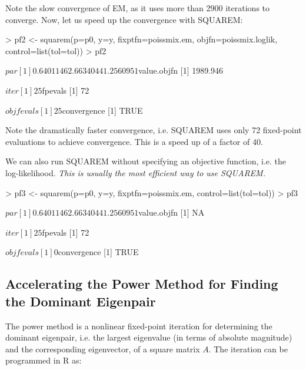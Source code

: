 \documentclass[english]{article}
\begin{document}
Note the slow convergence of EM, as it uses more than 2900 iterations to converge.  Now, let us speed up the convergence with SQUAREM:

\begin{Schunk}
\begin{Sinput}
> pf2 <- squarem(p=p0, y=y, fixptfn=poissmix.em, objfn=poissmix.loglik, 
  control=list(tol=tol))
> pf2
\end{Sinput}
\begin{Soutput}
$par
[1] 0.6401146 2.6634044 1.2560951

$value.objfn
[1] 1989.946

$iter
[1] 25

$fpevals
[1] 72

$objfevals
[1] 25

$convergence
[1] TRUE
\end{Soutput}
\end{Schunk}

Note the dramatically faster convergence, i.e. SQUAREM uses only 72 fixed-point evaluations to achieve convergence.  This is a speed up of a factor of 40.  

We can also run SQUAREM without specifying an objective function, i.e. the log-likelihood.  \emph{This is usually the most efficient way to use SQUAREM.}

\begin{Schunk}
\begin{Sinput}
> pf3 <- squarem(p=p0, y=y, fixptfn=poissmix.em, control=list(tol=tol))
> pf3
\end{Sinput}
\begin{Soutput}
$par
[1] 0.6401146 2.6634044 1.2560951

$value.objfn
[1] NA

$iter
[1] 25

$fpevals
[1] 72

$objfevals
[1] 0

$convergence
[1] TRUE
\end{Soutput}
\end{Schunk}


\subsection{Accelerating the Power Method for Finding the Dominant Eigenpair}

The power method is a nonlinear fixed-point iteration for determining the dominant eigenpair, i.e. the largest eigenvalue (in terms of absolute magnitude) and the corresponding eigenvector, of a square matrix $A.$  The iteration can be programmed in R as:
\end{document}
